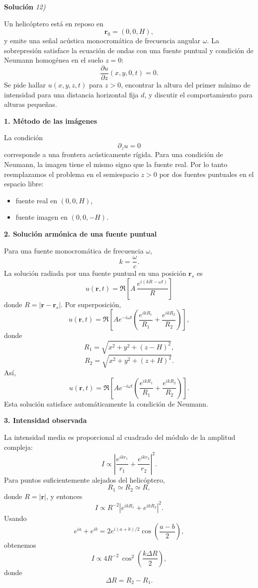 \documentclass[11pt,spanish]{article}
\newcounter{problema}
\begin{document}
\vspace{0.5cm}
{\bf Soluci\'on }{\em 12)}
\vspace{0.5cm}

Un helicóptero está en reposo en
$$
\mathbf r_0=(0,0,H),
$$
y emite una señal acústica monocromática de frecuencia angular $\omega$.
La sobrepresión satisface la ecuación de ondas con una fuente puntual y condición de Neumann homogénea en el suelo $z=0$:
$$
\frac{\partial u}{\partial z}(x,y,0,t)=0.
$$
Se pide hallar $u(x,y,z,t)$ para $z>0$, encontrar la altura del primer mínimo de intensidad para una distancia horizontal fija $d$, y discutir el comportamiento para alturas pequeñas. 

{\bf 1. Método de las imágenes}

La condición
$$
\partial_z u=0
$$
corresponde a una frontera acústicamente rígida.
Para una condición de Neumann, la imagen tiene el mismo signo que la fuente real.
Por lo tanto reemplazamos el problema en el semiespacio $z>0$ por dos fuentes puntuales en el espacio libre:
\begin{itemize}
\item fuente real en $(0,0,H)$,
\item fuente imagen en $(0,0,-H)$.
\end{itemize}

{\bf 2. Solución armónica de una fuente puntual}

Para una fuente monocromática de frecuencia $\omega$,
$$
k=\frac{\omega}{c}.
$$
La solución radiada por una fuente puntual en una posici\'on $\mathbf r_s$ es
$$
u(\mathbf r,t)
=
\Re\left[
A\,\frac{e^{i(kR-\omega t)}}{R}
\right]
$$
donde $R=|\mathbf r - \mathbf r_s|$.
Por superposición,
$$
u(\mathbf r,t)
=
\Re\left[
A e^{-i\omega t}
\left(
\frac{e^{ikR_1}}{R_1}
+
\frac{e^{ikR_2}}{R_2}
\right)
\right],
$$
donde
$$
R_1
=
\sqrt{x^2+y^2+(z-H)^2},
$$
$$
R_2
=
\sqrt{x^2+y^2+(z+H)^2}.
$$
Así,
$$
\boxed{
u(\mathbf r,t)
=
\Re\left[
A e^{-i\omega t}
\left(
\frac{e^{ikR_1}}{R_1}
+
\frac{e^{ikR_2}}{R_2}
\right)
\right].
}
$$
Esta solución satisface automáticamente la condición de Neumann.

{\bf 3. Intensidad observada}

La intensidad media es proporcional al cuadrado del módulo de la amplitud compleja:
$$
I
\propto
\left|
\frac{e^{ikr_1}}{r_1}
+
\frac{e^{ikr_2}}{r_2}
\right|^2.
$$
Para puntos suficientemente alejados del helicóptero,
$$
R_1\simeq R_2\simeq R,
$$
donde $R=|\mathbf r|$, y entonces
$$
I
\propto
R^{-2}
\left|
e^{ikR_1}+e^{ikR_2}
\right|^2.
$$
Usando
$$
e^{ia}+e^{ib}
=
2e^{i(a+b)/2}
\cos\left(\frac{a-b}{2}\right),
$$
obtenemos
$$
\boxed{
I
\propto
4R^{-2}\,\cos^2\left(
\frac{k\Delta R}{2}
\right),
}
$$
donde
$$
\Delta R=R_2-R_1.
$$
\end{document}
